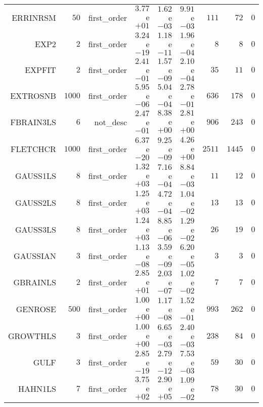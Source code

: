 \begin{longtable}{rrrrrrrrr}
ERRINRSM & \(    50\) & first\_order & \( 3.77\)e\(+01\) & \( 1.62\)e\(-03\) & \( 9.91\)e\(-03\) & \(   111\) & \(    72\) & \(     0\) \\
EXP2 & \(     2\) & first\_order & \( 3.24\)e\(-19\) & \( 1.18\)e\(-11\) & \( 1.96\)e\(-04\) & \(     8\) & \(     8\) & \(     0\) \\
EXPFIT & \(     2\) & first\_order & \( 2.41\)e\(-01\) & \( 1.57\)e\(-09\) & \( 2.10\)e\(-04\) & \(    35\) & \(    11\) & \(     0\) \\
EXTROSNB & \(  1000\) & first\_order & \( 5.95\)e\(-06\) & \( 5.04\)e\(-04\) & \( 2.78\)e\(-01\) & \(   636\) & \(   178\) & \(     0\) \\
FBRAIN3LS & \(     6\) & not\_desc & \( 2.47\)e\(-01\) & \( 8.38\)e\(+00\) & \( 2.81\)e\(+00\) & \(   906\) & \(   243\) & \(     0\) \\
FLETCHCR & \(  1000\) & first\_order & \( 6.37\)e\(-20\) & \( 9.25\)e\(-09\) & \( 4.26\)e\(+00\) & \(  2511\) & \(  1445\) & \(     0\) \\
GAUSS1LS & \(     8\) & first\_order & \( 1.32\)e\(+03\) & \( 7.16\)e\(-04\) & \( 8.84\)e\(-03\) & \(    11\) & \(    12\) & \(     0\) \\
GAUSS2LS & \(     8\) & first\_order & \( 1.25\)e\(+03\) & \( 4.72\)e\(-04\) & \( 1.04\)e\(-02\) & \(    13\) & \(    13\) & \(     0\) \\
GAUSS3LS & \(     8\) & first\_order & \( 1.24\)e\(+03\) & \( 8.85\)e\(-06\) & \( 1.29\)e\(-02\) & \(    26\) & \(    19\) & \(     0\) \\
GAUSSIAN & \(     3\) & first\_order & \( 1.13\)e\(-08\) & \( 3.59\)e\(-09\) & \( 6.20\)e\(-05\) & \(     3\) & \(     3\) & \(     0\) \\
GBRAINLS & \(     2\) & first\_order & \( 2.85\)e\(+01\) & \( 2.03\)e\(-07\) & \( 1.02\)e\(-02\) & \(     7\) & \(     7\) & \(     0\) \\
GENROSE & \(   500\) & first\_order & \( 1.00\)e\(+00\) & \( 1.17\)e\(-08\) & \( 1.52\)e\(-01\) & \(   993\) & \(   262\) & \(     0\) \\
GROWTHLS & \(     3\) & first\_order & \( 1.00\)e\(+00\) & \( 6.65\)e\(-03\) & \( 2.40\)e\(-03\) & \(   238\) & \(    84\) & \(     0\) \\
GULF & \(     3\) & first\_order & \( 2.85\)e\(-19\) & \( 2.79\)e\(-12\) & \( 7.53\)e\(-03\) & \(    59\) & \(    30\) & \(     0\) \\
HAHN1LS & \(     7\) & first\_order & \( 3.75\)e\(+02\) & \( 2.90\)e\(+05\) & \( 1.09\)e\(-02\) & \(    78\) & \(    30\) & \(     0\) \\

\end{longtable}
